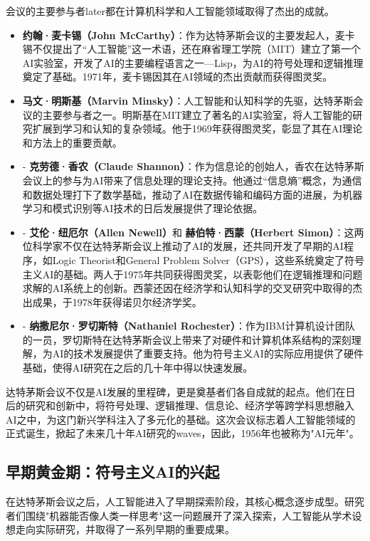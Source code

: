 会议的主要参与者later都在计算机科学和人工智能领域取得了杰出的成就。
\begin{itemize}
\item  {\bf 约翰·麦卡锡（John McCarthy）}：作为达特茅斯会议的主要发起人，麦卡锡不仅提出了“人工智能”这一术语，还在麻省理工学院（MIT）建立了第一个AI实验室，开发了AI的主要编程语言之一---Lisp，为AI的符号处理和逻辑推理奠定了基础。1971年，麦卡锡因其在AI领域的杰出贡献而获得图灵奖。
\item  {\bf 马文·明斯基（Marvin Minsky）}：人工智能和认知科学的先驱，达特茅斯会议的主要参与者之一。明斯基在MIT建立了著名的AI实验室，将人工智能的研究扩展到学习和认知的复杂领域。他于1969年获得图灵奖，彰显了其在AI理论和方法上的重要贡献。
\item -  {\bf 克劳德·香农（Claude Shannon）}：作为信息论的创始人，香农在达特茅斯会议上的参与为AI带来了信息处理的理论支持。他通过“信息熵”概念，为通信和数据处理打下了数学基础，推动了AI在数据传输和编码方面的进展，为机器学习和模式识别等AI技术的日后发展提供了理论依据。
\item -  {\bf 艾伦·纽厄尔（Allen Newell）}和 {\bf 赫伯特·西蒙（Herbert Simon）}：这两位科学家不仅在达特茅斯会议上推动了AI的发展，还共同开发了早期的AI程序，如Logic Theorist和General Problem Solver（GPS），这些系统奠定了符号主义AI的基础。两人于1975年共同获得图灵奖，以表彰他们在逻辑推理和问题求解的AI系统上的创新。西蒙还因在经济学和认知科学的交叉研究中取得的杰出成果，于1978年获得诺贝尔经济学奖。
\item -  {\bf 纳撒尼尔·罗切斯特（Nathaniel Rochester）}：作为IBM计算机设计团队的一员，罗切斯特在达特茅斯会议上带来了对硬件和计算机体系结构的深刻理解，为AI的技术发展提供了重要支持。他为符号主义AI的实际应用提供了硬件基础，使得AI研究在之后的几十年中得以快速发展。
\end{itemize}
达特茅斯会议不仅是AI发展的里程碑，更是奠基者们各自成就的起点。他们在日后的研究和创新中，将符号处理、逻辑推理、信息论、经济学等跨学科思想融入AI之中，为这门新兴学科注入了多元化的基础。这次会议标志着人工智能领域的正式诞生，掀起了未来几十年AI研究的waves，因此，1956年也被称为"AI元年"。

\subsection{早期黄金期：符号主义AI的兴起}

在达特茅斯会议之后，人工智能进入了早期探索阶段，其核心概念逐步成型。研究者们围绕"机器能否像人类一样思考"这一问题展开了深入探索，人工智能从学术设想走向实际研究，并取得了一系列早期的重要成果。

